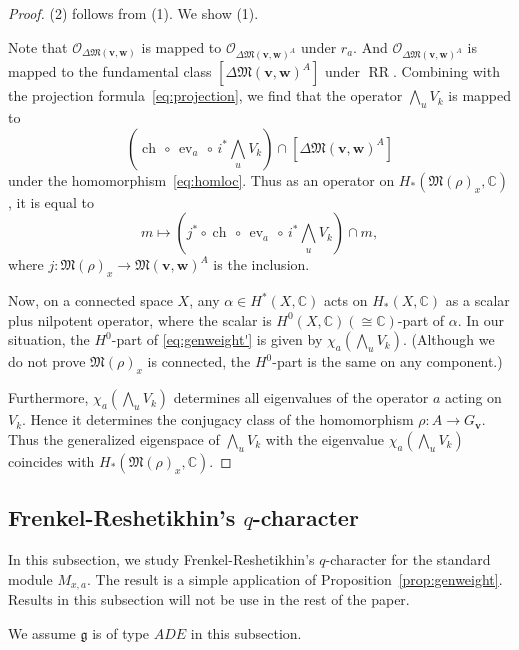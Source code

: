 \documentclass[12pt]{amsart}
\def\Bbb{\mathbb}
\def\frak{\mathfrak}
\theoremstyle{definition}
\theoremstyle{remark}
\numberwithin{equation}{subsection}
\newcommand{\propref}[1]{Proposition~\ref{#1}}
\newcommand{\C}{{\Bbb C}}
\newcommand{\M}{{\frak M}} %
\newcommand{\bv}{{\mathbf v}} %
\newcommand{\bw}{{\mathbf w}} %
\newcommand{\shfO}{\mathcal O}
\newcommand{\Wedge}{{\textstyle \bigwedge}}
\begin{document}
\begin{proof}
(2) follows from (1). We show (1).

Note that $\shfO_{\Delta\M(\bv,\bw)}$ is mapped to
$\shfO_{\Delta\M(\bv,\bw)^A}$ under $r_a$. And
$\shfO_{\Delta\M(\bv,\bw)^A}$ is mapped to
the fundamental class $[\Delta\M(\bv,\bw)^A]$ under
$\operatorname{RR}$.
%
Combining with the projection formula~\eqref{eq:projection}, we find
that the operator $\Wedge_u V_k$ is mapped to
\begin{equation*}
   \left(\operatorname{ch}\,\circ\, \operatorname{ev}_a\,\circ\, i^*
   \Wedge_u V_k\right) \cap [\Delta \M(\bv,\bw)^A]
\end{equation*}
under the homomorphism~\eqref{eq:homloc}.
Thus as an operator on $H_*(\M(\rho)_x, \C)$, it is equal to
\begin{equation}\label{eq:genweight'}
  m \mapsto 
    (j^*\circ \operatorname{ch}\,\circ\, \operatorname{ev}_a\,\circ\, i^*
    \Wedge_u V_k)\cap m,
\end{equation}
where $j\colon \M(\rho)_x\to \M(\bv,\bw)^A$ is the inclusion.

Now, on a connected space $X$, any $\alpha\in H^*(X,\C)$ acts on
$H_*(X,\C)$ as a scalar plus nilpotent operator, where the scalar is
$H^0(X,\C) (\cong \C)$-part of $\alpha$.
In our situation, the $H^0$-part of \eqref{eq:genweight'} is given by
$\chi_a(\Wedge_u V_k)$.
(Although we do not prove $\M(\rho)_x$ is connected, the $H^0$-part is 
the same on any component.)

Furthermore, $\chi_a(\Wedge_u V_k)$ determines all eigenvalues of the
operator $a$ acting on $V_k$. Hence it determines the conjugacy class
of the homomorphism $\rho\colon A\to G_\bv$. Thus the generalized
eigenspace of $\Wedge_u V_k$ with the eigenvalue $\chi_a(\Wedge_u
V_k)$ coincides with $H_*(\M(\rho)_x,\C)$.
\end{proof}

\subsection{Frenkel-Reshetikhin's $q$-character}\label{subsec:FR}
In this subsection, we study Frenkel-Reshetikhin's $q$-character for
the standard module $M_{x,a}$. The result is a simple application of
\propref{prop:genweight}. Results in this subsection will not be use
in the rest of the paper.

We assume $\mathfrak g$ is of type $ADE$ in this subsection.
\end{document}
